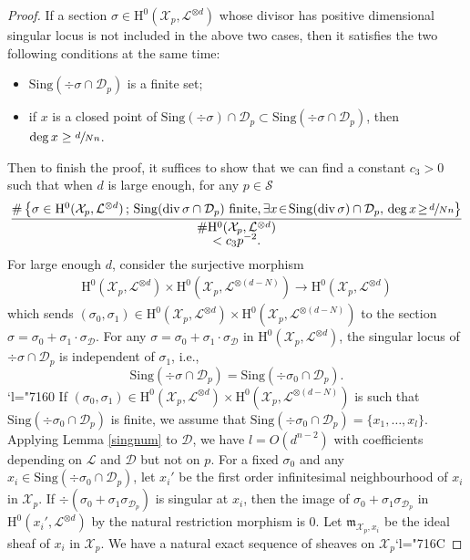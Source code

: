 \documentclass[11pt]{article}
\newcommand{\ie}{i.e.,\xspace}
\numberwithin{equation}{section}
\newcommand{\Changel}{\mathcode`l="7160}
\newcommand{\Changelback}{\mathcode`l="716C}
\newcommand{\sep}{\,;\,}
\theoremstyle{plain}
\theoremstyle{definition}
\newcommand{\ho}{\mathrm{H}}
\newcommand{\X}{\mathcal{X}}
\newcommand{\li}{\mathcal{L}}
\begin{document}
\begin{proof}
If a section $ \sigma\in \ho^0(\X_p, \li^{\otimes d})$ whose divisor has positive dimensional singular locus is not included in the above two cases, then it satisfies the two following conditions at the same time:
\begin{itemize}
\item $\mathrm{Sing}(\div \sigma\cap \mathcal{D}_p)$ is a finite set;
\item if $x$ is a closed point of $\mathrm{Sing}(\div \sigma)\cap \mathcal{D}_p\subset \mathrm{Sing}(\div \sigma\cap \mathcal{D}_p)$, then $\deg x\geq \sfrac{d}{Nn} $.
\end{itemize}
Then to finish the proof, it suffices to show that we can find a constant $c_3>0$ such that when $d$ is large enough, for any $p\in \mathcal{S}$
\begin{multline*}
\frac{\#\left\{ \sigma\in \ho^0(\X_p, \li^{\otimes d})\sep \mathrm{Sing}(\div \sigma\cap \mathcal{D}_p) \text{ finite,}\, \exists x\!\in\!\mathrm{Sing}(\div \sigma)\cap \mathcal{D}_p,\, \deg x\!\geq\! \sfrac{d}{Nn} \right\}}{\#\ho^0(\X_p, \li^{\otimes d})}\\[-5pt]
< c_3p^{-2}.
\end{multline*}
For large enough $d$, consider the surjective morphism
\begin{align*}
\ho^0(\X_p, \li^{\otimes d})\times \ho^0(\X_p, \li^{\otimes (d-N)}) \to \ho^0(\X_p, \li^{\otimes d})
\end{align*}
which sends $(\sigma_0, \sigma_1)\!\in\!\ho^0(\X_p, \li^{\otimes d})\times \ho^0(\X_p, \li^{\otimes (d-N)})$ to the section \hbox{$\sigma\!=\!\sigma_0\!+\!\sigma_1{\cdot} \sigma_{\mathcal{D}}$}. For any $\sigma=\sigma_0+\sigma_1\cdot \sigma_{\mathcal{D}}$ in $\ho^0(\X_p, \li^{\otimes d})$, the singular locus of $\div \sigma\cap \mathcal{D}_p$ is independent of $\sigma_1$, \ie
\[
\mathrm{Sing}(\div \sigma\cap \mathcal{D}_p)=\mathrm{Sing}(\div \sigma_0\cap \mathcal{D}_p).
\]
\Changel%
If $(\sigma_0, \sigma_1)\in \ho^0(\X_p, \li^{\otimes d})\times \ho^0(\X_p, \li^{\otimes (d-N)})$ is such that $\mathrm{Sing}(\div \sigma_0\cap \mathcal{D}_p)$ is finite, we assume that $\mathrm{Sing}(\div \sigma_0\cap \mathcal{D}_p)=\{ x_1,\dots ,x_l \}$. Applying Lemma \ref{singnum} to $\mathcal{D}$, we have $l=O(d^{n-2})$ with coefficients depending on $\li$ and $\mathcal{D}$ but not on $p$. For a fixed $\sigma_0$ and any $x_i\in \mathrm{Sing}(\div \sigma_0\cap \mathcal{D}_p)$, let $x_i'$ be the first order infinitesimal neighbourhood of $x_i$ in $\X_p$. If $\div \left(\sigma_0+\sigma_1\sigma_{\mathcal{D}_p}\right)$ is singular at $x_i$, then the image of $\sigma_0+\sigma_1\sigma_{\mathcal{D}_p}$ in $\ho^0(x_i', \li^{\otimes d})$ by the natural restriction morphism is $0$. Let $\mathfrak{m}_{\X_p, x_i}$ be the ideal sheaf of $x_i$ in $\X_p$. We have a natural exact sequence of sheaves on $\X_p$\Changelback%

\end{proof}
\end{document}
